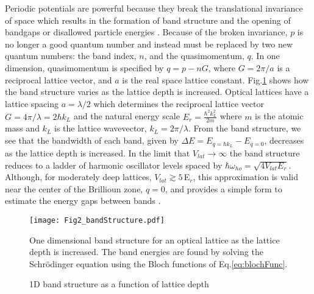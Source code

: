Periodic potentials are powerful because they break the translational invariance of space which results in the formation of band structure and the opening of bandgaps or disallowed particle energies \cite{Ashcroft1976}. Because of the broken invariance, $p$ is no longer a good quantum number and instead must be replaced by two new quantum numbers: the band index, $n$, and the quasimomentum, $q$. In one dimension, quasimomentum is specified by $q = p - nG$, where $G=2\pi/a$ is a reciprocal lattice vector, and $a$ is the real space lattice constant. Fig.\;\ref{fig:bandStructure} shows how the band structure varies as the lattice depth is increased. Optical lattices have a lattice spacing $a = \lambda /2$ which determines the reciprocal lattice vector $G = 4\pi / \lambda = 2 \hbar k_L$ and the natural energy scale $E_r = \frac{\hbar^2 k_L^2}{2m}$ where $m$ is the atomic mass and $k_L$ is the lattice wavevector, $k_L = 2\pi / \lambda$. From the band structure, we see that the bandwidth of each band, given by $\Delta E = E_{q=\hbar k_L} - E_{q=0}$, decreases as the lattice depth is increased. In the limit that $V_{lat}\!\rightarrow\!\infty$ the band structure reduces to a ladder of harmonic oscillator levels spaced by $\hbar \omega_{ho} = \sqrt{4 V_{lat} E_r}$. Although, for moderately deep lattices, $V_{lat} \gtrsim 5\,$E$_r$, this approximation is valid near the center of the Brillioun zone, $q = 0$, and provides a simple form to estimate the energy gaps between bands \cite{Jaksch1998,Jaksch2005}.


\begin{figure} \label{fig:bandStructure}
	\centerline{
	\texttt{[image: Fig2\_bandStructure.pdf]}}
	\caption{1D band structure as a function of lattice depth}{One dimensional band structure for an optical lattice as the lattice depth is increased. The band energies are found by solving the Schr\"{o}dinger equation using the Bloch functions of Eq.\;\ref{eq:blochFunc}.}
\end{figure}
	
